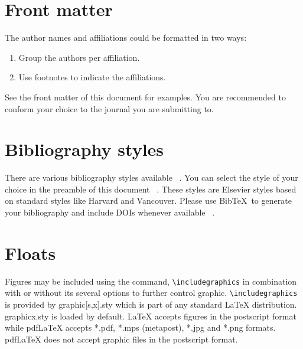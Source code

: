 \documentclass[a4paper,fleqn]{cas-dc}
\begin{document}
\section{Front matter}

The author names and affiliations could be formatted in two ways:
\begin{enumerate}[(1)]
\item Group the authors per affiliation.
\item Use footnotes to indicate the affiliations.
\end{enumerate}
See the front matter of this document for examples. 
You are recommended to conform your choice to the journal you 
are submitting to.

\section{Bibliography styles}

There are various bibliography styles available ~\citep{Fortunato2010}. You can select the
style of your choice in the preamble of this document ~\citep{Fortunato2010,NewmanGirvan2004}. These styles are
Elsevier styles based on standard styles like Harvard and Vancouver.
Please use Bib\TeX\ to generate your bibliography and include DOIs
whenever available ~\citep{Fortunato2010,Vehlowetal2013}.

\section{Floats}

{Figures} may be included using the command,\linebreak 
\verb+\includegraphics+ in
combination with or without its several options to further control
graphic. \verb+\includegraphics+ is provided by {graphic[s,x].sty}
which is part of any standard \LaTeX{} distribution.
{graphicx.sty} is loaded by default. \LaTeX{} accepts figures in
the postscript format while pdf\LaTeX{} accepts {*.pdf},
{*.mps} (metapost), {*.jpg} and {*.png} formats. 
pdf\LaTeX{} does not accept graphic files in the postscript format. 
\end{document}
